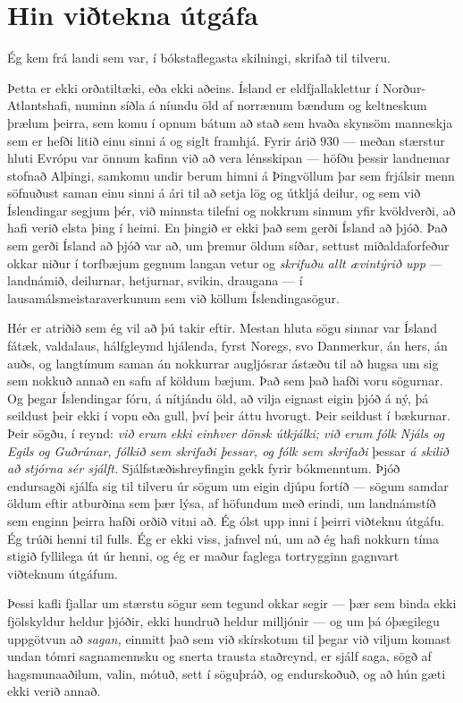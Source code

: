 \chapter{Hin viðtekna útgáfa}

Ég kem frá landi sem var, í bókstaflegasta skilningi, skrifað til tilveru.

Þetta er ekki orðatiltæki, eða ekki aðeins. Ísland er eldfjallaklettur í Norður-Atlantshafi, numinn síðla á níundu öld af norrænum bændum og keltneskum þrælum þeirra, sem komu í opnum bátum að stað sem hvaða skynsöm manneskja sem er hefði litið einu sinni á og siglt framhjá. Fyrir árið 930 — meðan stærstur hluti Evrópu var önnum kafinn við að vera lénsskipan — höfðu þessir landnemar stofnað Alþingi, samkomu undir berum himni á Þingvöllum þar sem frjálsir menn söfnuðust saman einu sinni á ári til að setja lög og útkljá deilur, og sem við Íslendingar segjum þér, við minnsta tilefni og nokkrum sinnum yfir kvöldverði, að hafi verið elsta þing í heimi. En þingið er ekki það sem gerði Ísland að þjóð. Það sem gerði Ísland að þjóð var að, um þremur öldum síðar, settust miðaldaforfeður okkar niður í torfbæjum gegnum langan vetur og \emph{skrifuðu allt ævintýrið upp} — landnámið, deilurnar, hetjurnar, svikin, draugana — í lausamálsmeistaraverkunum sem við köllum Íslendingasögur.

Hér er atriðið sem ég vil að þú takir eftir. Mestan hluta sögu sinnar var Ísland fátæk, valdalaus, hálfgleymd hjálenda, fyrst Noregs, svo Danmerkur, án hers, án auðs, og langtímum saman án nokkurrar augljósrar ástæðu til að hugsa um sig sem nokkuð annað en safn af köldum bæjum. Það sem það hafði voru sögurnar. Og þegar Íslendingar fóru, á nítjándu öld, að vilja eignast eigin þjóð á ný, þá seildust þeir ekki í vopn eða gull, því þeir áttu hvorugt. Þeir seildust í bækurnar. Þeir sögðu, í reynd: \emph{við erum ekki einhver dönsk útkjálki; við erum fólk Njáls og Egils og Guðrúnar, fólkið sem skrifaði þessar, og fólk sem skrifaði} þessar \emph{á skilið að stjórna sér sjálft.} Sjálfstæðishreyfingin gekk fyrir bókmenntum. Þjóð endursagði sjálfa sig til tilveru úr sögum um eigin djúpu fortíð — sögum samdar öldum eftir atburðina sem þær lýsa, af höfundum með erindi, um landnámstíð sem enginn þeirra hafði orðið vitni að. Ég ólst upp inni í þeirri viðteknu útgáfu. Ég trúði henni til fulls. Ég er ekki viss, jafnvel nú, um að ég hafi nokkurn tíma stigið fyllilega út úr henni, og ég er maður faglega tortrygginn gagnvart viðteknum útgáfum.

Þessi kafli fjallar um stærstu sögur sem tegund okkar segir — þær sem binda ekki fjölskyldur heldur þjóðir, ekki hundruð heldur milljónir — og um þá óþægilegu uppgötvun að \emph{sagan,} einmitt það sem við skírskotum til þegar við viljum komast undan tómri sagnamennsku og snerta trausta staðreynd, er sjálf saga, sögð af hagsmunaaðilum, valin, mótuð, sett í söguþráð, og endurskoðuð, og að hún gæti ekki verið annað.

